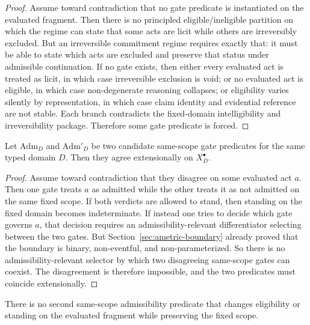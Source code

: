\begin{proof}
Assume toward contradiction that no gate predicate is instantiated on the evaluated fragment. Then there is no principled eligible/ineligible partition on which the regime can state that some acts are licit while others are irreversibly excluded. But an irreversible commitment regime requires exactly that: it must be able to state which acts are excluded and preserve that status under admissible continuation. If no gate exists, then either every evaluated act is treated as licit, in which case irreversible exclusion is void; or no evaluated act is eligible, in which case non-degenerate reasoning collapses; or eligibility varies silently by representation, in which case claim identity and evidential reference are not stable. Each branch contradicts the fixed-domain intelligibility and irreversibility package. Therefore some gate predicate is forced.\cite{MaleyNecessity,MaleyUnus}
\end{proof}

\begin{theorem}
\label{thm:unique-same-scope-classification}
Let $\mathrm{Adm}_D$ and $\mathrm{Adm}'_D$ be two candidate same-scope gate predicates for the same typed domain $D$. Then they agree extensionally on $X_D^{\bullet}$.
\end{theorem}

\begin{proof}
Assume toward contradiction that they disagree on some evaluated act $a$. Then one gate treats $a$ as admitted while the other treats it as not admitted on the same fixed scope. If both verdicts are allowed to stand, then standing on the fixed domain becomes indeterminate. If instead one tries to decide which gate governs $a$, that decision requires an admissibility-relevant differentiator selecting between the two gates. But Section~\ref{sec:ametric-boundary} already proved that the boundary is binary, non-eventful, and non-parameterized. So there is no admissibility-relevant selector by which two disagreeing same-scope gates can coexist. The disagreement is therefore impossible, and the two predicates must coincide extensionally.\cite{MaleyNecessity,MaleyUnus}
\end{proof}

\begin{corollary}
There is no second same-scope admissibility predicate that changes eligibility or standing on the evaluated fragment while preserving the fixed scope.
\end{corollary}

